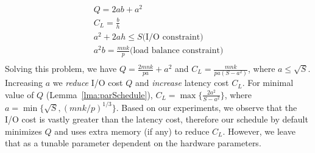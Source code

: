 \documentclass[sigplan,review,anonymous,10pt]{acmart}\settopmatter{printfolios=true,printccs=false,printacmref=false}
\begin{document}
\begin{multline}
\\
Q = 2ab + a^2 \\
C_L = \frac{b}{h} \\
a^2 + 2ah \le S \text{(I/O constraint)} \\
a^2b = \frac{mnk}{p} \text{(load balance constraint)} \\
\end{multline}
Solving this problem, we have $Q = \frac{2mnk}{pa} + a^2$ and $C_L 
= 
\frac{mnk}{pa(S-a^2)}$, 
where $a \le \sqrt{S}$. Increasing $a$ we \emph{reduce} I/O cost 
$Q$ and \emph{increase} latency cost $C_L$. For minimal value of 
$Q$ (Lemma~\ref{lma:parSchedule}),  $C_L = \max\{\frac{2a^2}{S - 
a^2}\}$, where $a = \min\{\sqrt{S}, (mnk/p)^{1/3} \}$. Based on our 
experiments, we observe that the I/O cost is vastly greater than the 
latency cost, therefore our schedule by default minimizes $Q$ and uses 
extra memory (if any) to reduce $C_L$. However, we leave that as a tunable 
parameter dependent on the hardware parameters.
\end{document}
